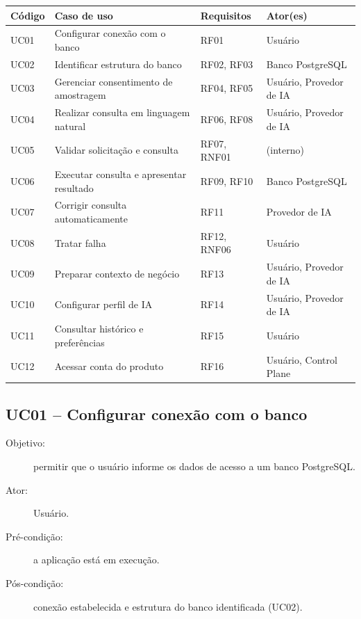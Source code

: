 \begin{apendicesenv}
\begin{quadro}[htb]
    \caption{Casos de uso e requisitos atendidos}
    \label{qua:casos-uso}
    \begin{tabular}{|p{1.5cm}|p{6.2cm}|p{3.0cm}|p{3.5cm}|}
        \hline
        \textbf{Código} & \textbf{Caso de uso} & \textbf{Requisitos} & \textbf{Ator(es)} \\ \hline
        UC01 & Configurar conexão com o banco & RF01 & Usuário \\ \hline
        UC02 & Identificar estrutura do banco & RF02, RF03 & Banco PostgreSQL \\ \hline
        UC03 & Gerenciar consentimento de amostragem & RF04, RF05 & Usuário, Provedor de IA \\ \hline
        UC04 & Realizar consulta em linguagem natural & RF06, RF08 & Usuário, Provedor de IA \\ \hline
        UC05 & Validar solicitação e consulta & RF07, RNF01 & (interno) \\ \hline
        UC06 & Executar consulta e apresentar resultado & RF09, RF10 & Banco PostgreSQL \\ \hline
        UC07 & Corrigir consulta automaticamente & RF11 & Provedor de IA \\ \hline
        UC08 & Tratar falha & RF12, RNF06 & Usuário \\ \hline
        UC09 & Preparar contexto de negócio & RF13 & Usuário, Provedor de IA \\ \hline
        UC10 & Configurar perfil de IA & RF14 & Usuário, Provedor de IA \\ \hline
        UC11 & Consultar histórico e preferências & RF15 & Usuário \\ \hline
        UC12 & Acessar conta do produto & RF16 & Usuário, Control Plane \\ \hline
    \end{tabular}
\end{quadro}

\subsection{UC01 -- Configurar conexão com o banco}

\begin{description}
    \item[Objetivo:] permitir que o usuário informe os dados de acesso a um banco PostgreSQL.
    \item[Ator:] Usuário.
    \item[Pré-condição:] a aplicação está em execução.
    \item[Pós-condição:] conexão estabelecida e estrutura do banco identificada (UC02).
\end{description}


\end{apendicesenv}
